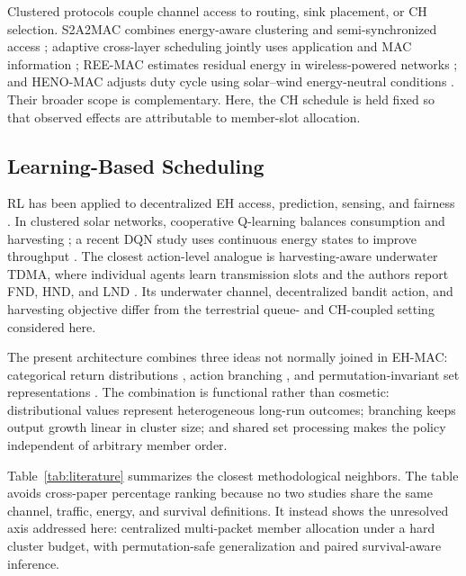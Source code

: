 \documentclass[journal]{IEEEtran}
\begin{document}
Clustered protocols couple channel access to routing, sink placement, or CH
selection. S2A2MAC combines energy-aware clustering and semi-synchronized
access \cite{movva2022s2a2mac}; adaptive cross-layer scheduling jointly uses
application and MAC information \cite{sefuba2015adaptive}; REE-MAC estimates
residual energy in wireless-powered networks \cite{lee2021reemac}; and
HENO-MAC adjusts duty cycle using solar--wind energy-neutral conditions
\cite{sarang2024henomac}. Their broader scope is complementary. Here, the CH
schedule is held fixed so that observed effects are attributable to
member-slot allocation.

\subsection{Learning-Based Scheduling}

RL has been applied to decentralized EH access, prediction, sensing, and
fairness \cite{chu2019multiaccess,sharma2019structure,li2018fair,
biason2016decentralized,leong2020drl}. In clustered solar networks, cooperative
Q-learning balances consumption and harvesting \cite{ge2021cooperative}; a
recent DQN study uses continuous energy states to improve throughput
\cite{hasani2025drl}. The closest action-level analogue is harvesting-aware
underwater TDMA, where individual agents learn transmission slots and the
authors report FND, HND, and LND \cite{eris2024underwaterrl}. Its underwater
channel, decentralized bandit action, and harvesting objective differ from
the terrestrial queue- and CH-coupled setting considered here.

The present architecture combines three ideas not normally joined in EH-MAC:
categorical return distributions \cite{bellemare2017c51}, action branching
\cite{tavakoli2018branching}, and permutation-invariant set representations
\cite{zaheer2017deepsets}. The combination is functional rather than cosmetic:
distributional values represent heterogeneous long-run outcomes; branching
keeps output growth linear in cluster size; and shared set processing makes
the policy independent of arbitrary member order.

Table~\ref{tab:literature} summarizes the closest methodological neighbors.
The table avoids cross-paper percentage ranking because no two studies share
the same channel, traffic, energy, and survival definitions. It instead shows
the unresolved axis addressed here: centralized multi-packet member allocation
under a hard cluster budget, with permutation-safe generalization and paired
survival-aware inference.
\end{document}
